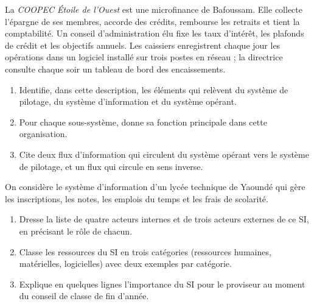\documentclass[11pt]{article}
\newcounter{popsec}
\newcounter{popsub}
\newcommand{\courssub}[1]{%
  \stepcounter{popsub}%
  \par\vspace{9pt}\noindent{\popxbold\fontsize{11.5}{13}\selectfont\color{popink}{\color{poporange}\thepopsec.\thepopsub}\hspace{6pt}#1}\par\nopagebreak\vspace{4pt}
}
\begin{document}
\courssub{Je m'entraîne}

\begin{exercice}
La \emph{COOPEC Étoile de l'Ouest} est une microfinance de Bafoussam. Elle collecte l'épargne de ses membres, accorde des crédits, rembourse les retraits et tient la comptabilité. Un conseil d'administration élu fixe les taux d'intérêt, les plafonds de crédit et les objectifs annuels. Les caissiers enregistrent chaque jour les opérations dans un logiciel installé sur trois postes en réseau ; la directrice consulte chaque soir un tableau de bord des encaissements.
\begin{enumerate}
    \item Identifie, dans cette description, les éléments qui relèvent du système de pilotage, du système d'information et du système opérant.
    \item Pour chaque sous-système, donne sa fonction principale dans cette organisation.
    \item Cite deux flux d'information qui circulent du système opérant vers le système de pilotage, et un flux qui circule en sens inverse.
\end{enumerate}
\end{exercice}

\begin{exercice}
On considère le système d'information d'un lycée technique de Yaoundé qui gère les inscriptions, les notes, les emplois du temps et les frais de scolarité.
\begin{enumerate}
    \item Dresse la liste de quatre acteurs internes et de trois acteurs externes de ce SI, en précisant le rôle de chacun.
    \item Classe les ressources du SI en trois catégories (ressources humaines, matérielles, logicielles) avec deux exemples par catégorie.
    \item Explique en quelques lignes l'importance du SI pour le proviseur au moment du conseil de classe de fin d'année.
\end{enumerate}
\end{exercice}
\end{document}
